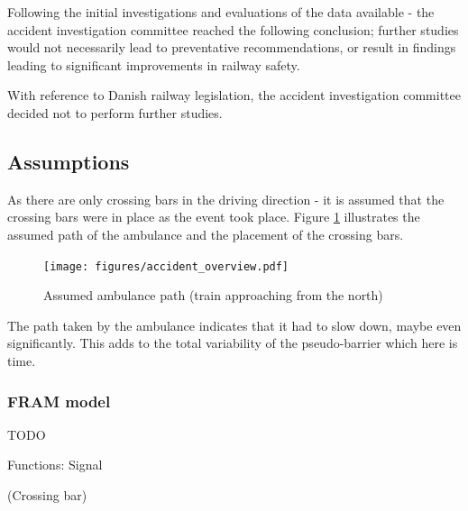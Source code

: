 \documentclass[10pt,oneside]{book}                  %
\begin{document}
Following the initial investigations and evaluations of the data available - the accident investigation committee reached the following conclusion; further studies would not necessarily lead to preventative recommendations, or result in findings leading to significant improvements in railway safety.

With reference to Danish railway legislation, the accident investigation committee decided not to perform further studies. 

\subsection{Assumptions}
As there are only crossing bars in the driving direction - it is assumed that the crossing bars were in place as the event took place. Figure \ref{fig:ambulance_path} illustrates the assumed path of the ambulance and the placement of the crossing bars.
\begin{figure}
 \centering
   \texttt{[image: figures/accident\_overview.pdf]}
 \caption{Assumed ambulance path (train approaching from the north)}
 \label{fig:ambulance_path}
\end{figure}
The path taken by the ambulance indicates that it had to slow down, maybe even significantly. This adds to the total variability of the pseudo-barrier which here is time.

\subsubsection{FRAM model}
TODO




% 

Functions: 
Signal

(Crossing bar)
\end{document}
